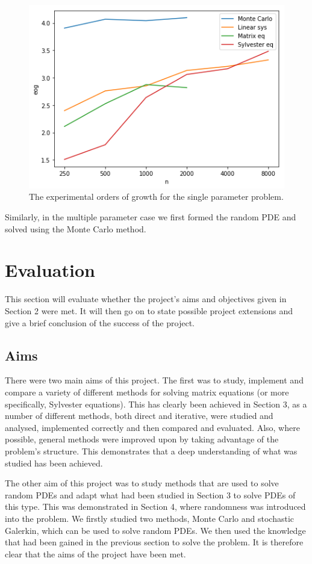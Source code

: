 \documentclass[11pt]{article}
\numberwithin{equation}{section}
\begin{document}
\begin{figure}[H]
\centering
\includegraphics[scale=.6]{img/singleeog.png}
\caption{The experimental orders of growth for the single parameter problem.}
\label{fig:single eogs}
\end{figure}

Similarly, in the multiple parameter case we first formed the random PDE and solved using the Monte Carlo method.


\newpage

\section{Evaluation}
This section will evaluate whether the project's aims and objectives given in Section 2 were met. It will then go on to state possible project extensions and give a brief conclusion of the success of the project.

\subsection{Aims}
There were two main aims of this project. The first was to study, implement and compare a variety of different methods for solving matrix equations (or more specifically, Sylvester equations). This has clearly been achieved in Section 3, as a number of different methods, both direct and iterative, were studied and analysed, implemented correctly and then compared and evaluated. Also, where possible, general methods were improved upon by taking advantage of the problem's structure. This demonstrates that a deep understanding of what was studied has been achieved.

The other aim of this project was to study methods that are used to solve random PDEs and adapt what had been studied in Section 3 to solve PDEs of this type. This was demonstrated in Section 4, where randomness was introduced into the problem. We firstly studied two methods, Monte Carlo and stochastic Galerkin, which can be used to solve random PDEs. We then used the knowledge that had been gained in the previous section to solve the problem. It is therefore clear that the aims of the project have been met.
\end{document}
